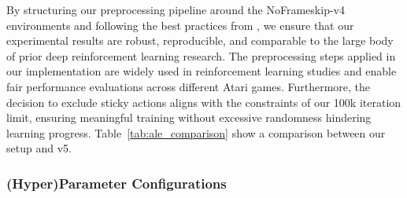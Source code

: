 By structuring our preprocessing pipeline around the NoFrameskip-v4 environments and following the best practices from \cite{machado:revisiting_ale}, we ensure that our experimental results are robust, reproducible, and comparable to the large body of prior deep reinforcement learning research. The preprocessing steps applied in our implementation are widely used in reinforcement learning studies and enable fair performance evaluations across different Atari games. Furthermore, the decision to exclude sticky actions aligns with the constraints of our 100k iteration limit, ensuring meaningful training without excessive randomness hindering learning progress. Table~\ref{tab:ale_comparison} show a comparison between our setup and v5.

\begin{table}
	\caption{Comparison between our setup based on NoFrameskip-v4 and ALE v5 environments.}
	\label{tab:ale_comparison}
	\centering
\end{table}

\subsubsection{(Hyper)Parameter Configurations}

